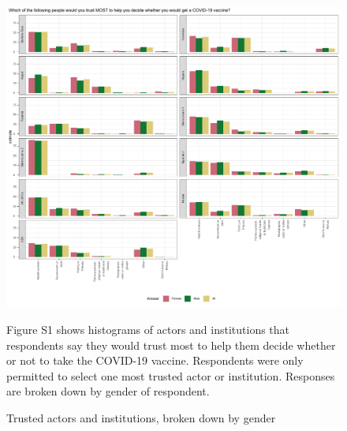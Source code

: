 \documentclass[
  12pt,
]{article}
\begin{document}
\begin{figure}[!ht]
\caption{Trusted actors and institutions, broken down by gender \label{fig:genderhist}}

\includegraphics{paper_files/figure-latex/genderhist-1.pdf}

\scriptsize{Figure S1 shows histograms of actors and institutions that respondents say they would trust most to help them decide whether or not to take the COVID-19 vaccine. Respondents were only permitted to select one most trusted  actor or institution. Responses are broken down by gender of respondent.}
\end{figure}

\pagebreak
\end{document}
